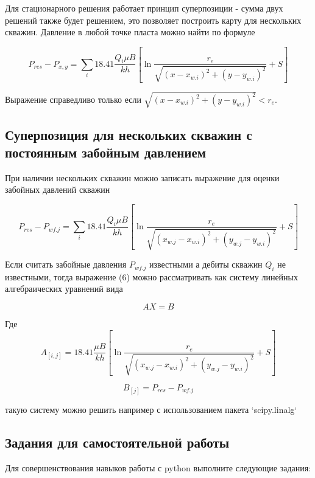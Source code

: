 \documentclass[oneside, openany]{memoir}
\begin{document}
	Для стационарного решения работает принцип суперпозиции - сумма двух решений также будет решением, это позволяет построить карту для нескольких скважин.
	Давление в любой точке пласта можно найти по формуле
	
	\begin{equation}
	P_{res} - P_{x,y} =  \sum_{i} 18.41\dfrac{ Q_i\mu B }{kh} \left[ \ln\frac{r_e}{\sqrt{ (x-x_{w.i})^2 + (y-y_{w.i})^2 }} +S \right]
	\end{equation}
	
	Выражение справедливо только если $\sqrt{ (x-x_{w.i})^2 + (y-y_{w.i})^2 }< r_e$.
	
	\subsection{Суперпозиция для нескольких скважин с постоянным забойным давлением}
	
	При наличии нескольких скважин можно записать выражение для оценки забойных давлений скважин
	
	
	$$
	P_{res} - P_{wf.j} =  \sum_{i} 18.41\dfrac{ Q_i\mu B }{kh} \left[ \ln\dfrac{r_e}{\sqrt{ (x_{w.j}-x_{w.i})^2 + (y_{w.j}-y_{w.i})^2 }} +S \right]
	$$
	
	Если считать забойные давления $P_{wf.j}$ известными а дебиты скважин $Q_i$ не известными, тогда выражение (6) можно рассматривать как систему линейных алгебраических уравнений вида
	
	$$AX = B$$
	
	Где
	$$
	A_{[i,j]} = 18.41\dfrac{ \mu B }{kh} \left[ \ln\dfrac{r_e}{\sqrt{ (x_{w.j}-x_{w.i})^2 + (y_{w.j}-y_{w.i})^2 }} +S \right]
	$$
	
	$$
	B_{[j]}=P_{res} - P_{wf.j}
	$$
	
	такую систему можно решить например с использованием пакета `scipy.linalg` 
	
	\subsection{Задания для самостоятельной работы}
	
	Для совершенствования навыков работы с python выполните следующие задания:
	
\end{document}
